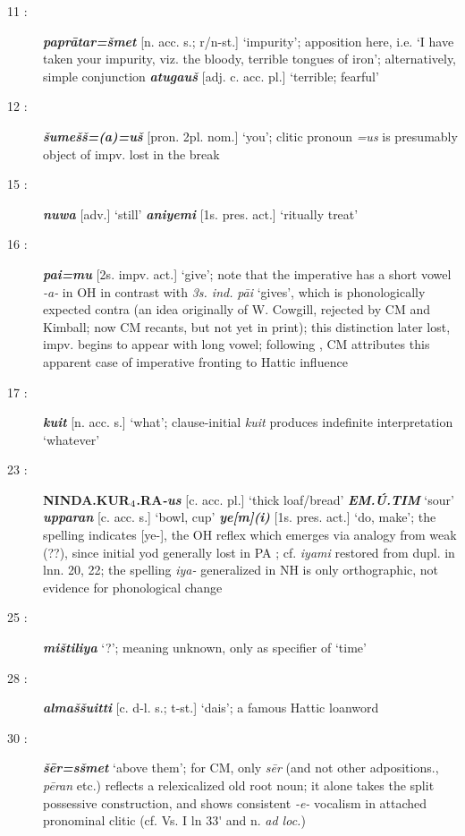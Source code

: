 \documentclass[10pt]{article}
\newcommand{\subsc}[1]{$_{\textrm{\scriptsize{#1}}}$}	%
\newcommand{\bit}[1]{\textbf{\textit{#1}}}				%
\newcommand{\p}[1]{{\tiny[{#1}]}}					%
\newcommand{\pr}{\'{ }}									%
\newcommand{\hith}{\textsubwedge{h}}
\renewcommand{\.}[1]{\textsubdot{#1}}
\begin{document}
\begin{description}
\item[11 :] \bit{papr\=atar=\v{s}met} \p{n. acc. s.; r/n-st.} `impurity'; apposition here, i.e. `I have taken your impurity, viz. the bloody, terrible tongues of iron'; alternatively, simple conjunction \bit{{\hith}atugau\v{s}} \p{adj. c. acc. pl.} `terrible; fearful'

\item[12 :] \bit{\v{s}ume\v{s}\v{s}=(a)=u\v{s}} \p{pron. 2pl. nom.} `you'; clitic pronoun \textit{=us} is presumably object of impv. lost in the break

\item[15 :] \bit{nuwa} \p{adv.} `still' \bit{aniyemi} \p{1s. pres. act.} `ritually treat'

\item[16 :] \bit{pai=mu} \p{2s. impv. act.} `give'; note that the imperative has a short vowel \textit{-a-} in OH in contrast with \textit{3s. ind.} \textit{p\=ai} `gives', which is phonologically expected contra \citet{kimball1998origin, kimball1999hhp} (an idea originally of W. Cowgill, rejected by CM and Kimball; now CM recants, but not yet in print); this distinction later lost, impv. begins to appear with long vowel; following \citet{bauer2011hittite}, CM attributes this apparent case of imperative fronting  to Hattic influence

\item[17 :] \bit{kuit} \p{n. acc. s.} `what'; clause-initial \textit{kuit} produces indefinite interpretation `whatever'

\item[23 :] \textbf{NINDA.KUR\subsc{4}.RA}\bit{-us} \p{c. acc. pl.} `thick loaf/bread' \bit{EM.\'U.TIM} `sour' \bit{{\hith}upparan} \p{c. acc. s.} `bowl, cup' \bit{ye[m](i)} \p{1s. pres. act.} `do, make'; the spelling indicates [ye-], the OH reflex which emerges via analogy from weak (??), since initial yod generally lost in PA ; cf. \textit{iyami} restored from dupl. in lnn. 20, 22; the spelling \textit{iya-} generalized in NH is only orthographic, not evidence for phonological change

\item[25 :] \bit{mi\v{s}tiliya} `?'; meaning unknown, only as specifier of `time'

\item[28 :] \bit{{\hith}alma\v{s}\v{s}uitti} \p{c. d-l. s.; t-st.} `dais'; a famous Hattic loanword

\item[30 :] \bit{\v{s}\=er=s\v{s}met} `above them'; for CM, only \textit{s\=er} (and not other adpositions., \textit{p\=eran} etc.) reflects a relexicalized old root noun; it alone takes the split possessive construction, and shows consistent \textit{-e-} vocalism in attached pronominal clitic (cf. Vs. I ln 33{\pr} and n. \textit{ad loc.})


\end{description}
\end{document}
